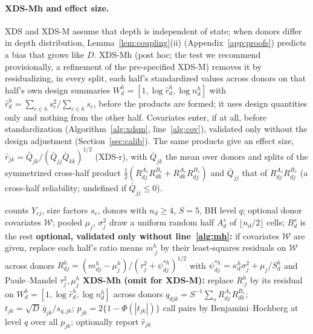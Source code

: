 \documentclass[10pt,letterpaper]{article}
\theoremstyle{definition}
\theoremstyle{remark}
\begin{document}
\paragraph{XDS-Mh and effect size.} XDS and XDS-M assume that depth is independent of state; when donors differ in depth distribution, Lemma~\ref{lem:coupling}(ii) (Appendix~\ref{app:proofs}) predicts a bias that grows like $D$. XDS-Mh (post hoc; the test we recommend provisionally, a refinement of the pre-specified XDS-M) removes it by residualizing, in every split, each half's standardized values across donors on that half's own design summaries $W^h_d=[1,\log\hat r^h_d,\log n^h_d]$ with $\hat r^h_d=\sum_{c\in h}s_c^2/\sum_{c\in h}s_c$, before the products are formed; it uses design quantities only and nothing from the other half. Covariates enter, if at all, before standardization (Algorithm~\ref{alg:xdsm}, line~\ref{alg:cov}), validated only without the design adjustment (Section~\ref{sec:calib}). The same products give an effect size, $\hat r_{jk}=\bar Q_{jk}/(\bar Q_{jj}\bar Q_{kk})^{1/2}$ (XDS-r), with $\bar Q_{jk}$ the mean over donors and splits of the symmetrized cross-half product $\tfrac12(R^{A_s}_{dj}R^{B_s}_{dk}+R^{A_s}_{dk}R^{B_s}_{dj})$ and $\bar Q_{jj}$ that of $R^{A_s}_{dj}R^{B_s}_{dj}$ (a cross-half reliability; undefined if $\bar Q_{jj}\le0$).

\begin{algorithm}[!t]
\caption{XDS-Mh, the provisionally recommended test; omitting line~\ref{alg:mh} gives XDS-M, adding known batch indicators to its columns gives XDS-Mhb. Optional covariate step in line~\ref{alg:cov}.}\label{alg:xdsm}
\begin{algorithmic}[1]
\Require counts $Y_{cj}$, size factors $s_c$, donors with $n_d\ge4$, $S=5$, BH level $q$; optional donor covariates $\mathcal W$; pooled $\mu_j$, $\sigma^2_j$
  \State draw a uniform random half $A^s_d$ of $\lfloor n_d/2\rfloor$ cells; $B^s_d$ is the rest
  \State \textbf{optional, validated only without line~\ref{alg:mh}:} if covariates $\mathcal W$ are given, replace each half's ratio means $m^h_{\cdot j}$ by their least-squares residuals on $\mathcal W$ across donors \label{alg:cov}
  \State $R^h_{dj}=(m^h_{dj}-\mu^h_j)/(\tau^2_j+\psi^{*h}_{dj})^{1/2}$ with $\psi^{*h}_{dj}=\kappa^h_d\sigma^2_j+\mu_j/S^h_d$ and Paule--Mandel $\tau^2_j,\mu^h_j$ 
  \State \textbf{XDS-Mh (omit for XDS-M):} replace $R^h_{\cdot j}$ by its residual on $W^h_d=[1,\log\hat r^h_d,\log n^h_d]$ across donors\label{alg:mh}
\EndFor
{}
  \State $q_{djk}=S^{-1}\sum_s R^{A_s}_{dj}R^{B_s}_{dk}$; $t_{jk}=\sqrt D\,\bar q_{jk}/s_{q,jk}$; $p_{jk}=2\{1-\Phi(|t_{jk}|)\}$
\EndFor
\State call pairs by Benjamini--Hochberg at level $q$ over all $p_{jk}$; optionally report $\hat r_{jk}$
\end{algorithmic}
\end{algorithm}
\end{document}
